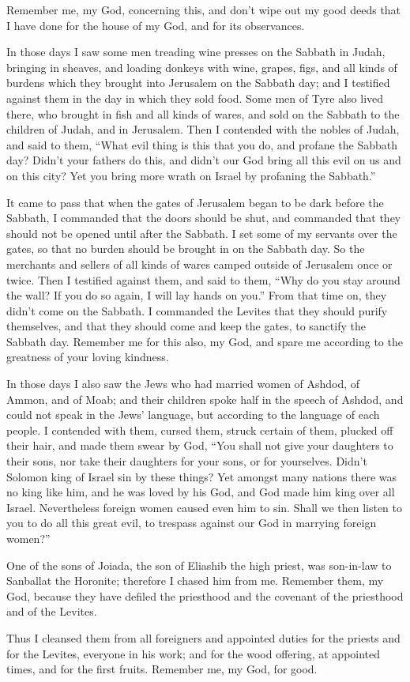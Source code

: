  Remember me, my God, concerning this, and don't wipe out
my good deeds that I have done for the house of my God, and for its
observances.

 In those days I saw some men treading wine presses on the
Sabbath in Judah, bringing in sheaves, and loading donkeys with wine,
grapes, figs, and all kinds of burdens which they brought into Jerusalem
on the Sabbath day; and I testified against them in the day in which
they sold food.  Some men of Tyre also lived there, who
brought in fish and all kinds of wares, and sold on the Sabbath to the
children of Judah, and in Jerusalem.  Then I contended with
the nobles of Judah, and said to them, ``What evil thing is this that
you do, and profane the Sabbath day?  Didn't your fathers
do this, and didn't our God bring all this evil on us and on this city?
Yet you bring more wrath on Israel by profaning the Sabbath.''

 It came to pass that when the gates of Jerusalem began to
be dark before the Sabbath, I commanded that the doors should be shut,
and commanded that they should not be opened until after the Sabbath. I
set some of my servants over the gates, so that no burden should be
brought in on the Sabbath day.  So the merchants and
sellers of all kinds of wares camped outside of Jerusalem once or twice.
 Then I testified against them, and said to them, ``Why do
you stay around the wall? If you do so again, I will lay hands on you.''
From that time on, they didn't come on the Sabbath.  I
commanded the Levites that they should purify themselves, and that they
should come and keep the gates, to sanctify the Sabbath day. Remember me
for this also, my God, and spare me according to the greatness of your
loving kindness.

 In those days I also saw the Jews who had married women of
Ashdod, of Ammon, and of Moab;  and their children spoke
half in the speech of Ashdod, and could not speak in the Jews' language,
but according to the language of each people.  I contended
with them, cursed them, struck certain of them, plucked off their hair,
and made them swear by God, ``You shall not give your daughters to their
sons, nor take their daughters for your sons, or for yourselves.
 Didn't Solomon king of Israel sin by these things? Yet
amongst many nations there was no king like him, and he was loved by his
God, and God made him king over all Israel. Nevertheless foreign women
caused even him to sin.  Shall we then listen to you to do
all this great evil, to trespass against our God in marrying foreign
women?''

 One of the sons of Joiada, the son of Eliashib the high
priest, was son-in-law to Sanballat the Horonite; therefore I chased him
from me.  Remember them, my God, because they have defiled
the priesthood and the covenant of the priesthood and of the Levites.

 Thus I cleansed them from all foreigners and appointed
duties for the priests and for the Levites, everyone in his work;
 and for the wood offering, at appointed times, and for the
first fruits. Remember me, my God, for good.

